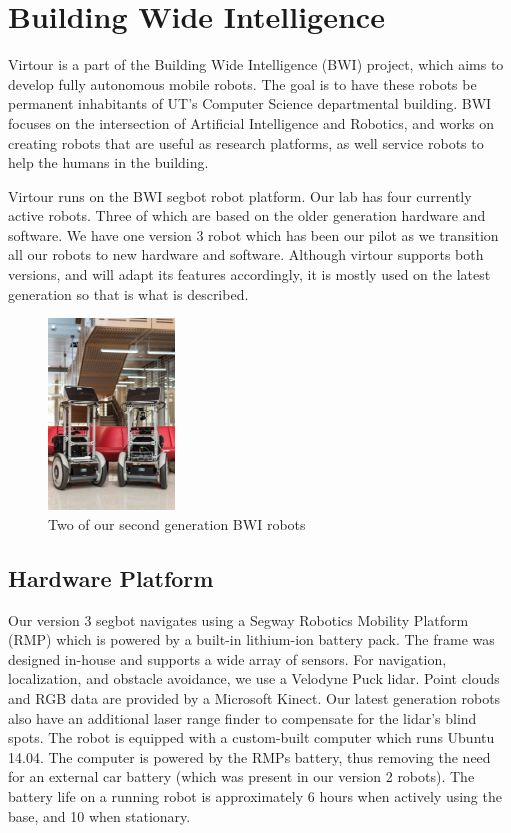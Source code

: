 \documentclass[
  oneside,
  11pt, a4paper,
  footinclude=true,
  headinclude=true,
  cleardoublepage=empty
]{article}
\begin{document}
\section{Building Wide Intelligence}

Virtour is a part of the Building Wide Intelligence (BWI) project, which aims
to develop fully autonomous mobile robots. The goal is to have these robots be
permanent inhabitants of UT's Computer Science departmental building. BWI
focuses on the intersection of Artificial Intelligence and Robotics, and works
on creating robots that are useful as research platforms, as well service
robots to help the humans in the building.

Virtour runs on the BWI segbot robot platform. Our lab has four currently
active robots. Three of which are based on the older generation hardware and
software. We have one version 3 robot which has been our pilot as we transition
all our robots to new hardware and software. Although virtour supports both
versions, and will adapt its features accordingly, it is mostly used on the
latest generation so that is what is described.

\begin{figure}
\centering
\includegraphics[height=2in]{bwi}
\caption{Two of our second generation BWI robots}
\end{figure}

\subsection{Hardware Platform}

Our version 3 segbot navigates using a Segway Robotics Mobility Platform (RMP)
which is powered by a built-in lithium-ion battery pack. The frame was designed
in-house and supports a wide array of sensors. For navigation, localization,
and obstacle avoidance, we use a Velodyne Puck lidar. Point clouds and RGB data
are provided by a Microsoft Kinect. Our latest generation robots also have an
additional laser range finder to compensate for the lidar's blind spots. The
robot is equipped with a custom-built computer which runs Ubuntu 14.04. The
computer is powered by the RMPs battery, thus removing the need for an external
car battery (which was present in our version 2 robots).  The battery life on a
running robot is approximately 6 hours when actively using the base, and 10
when stationary.
\end{document}

